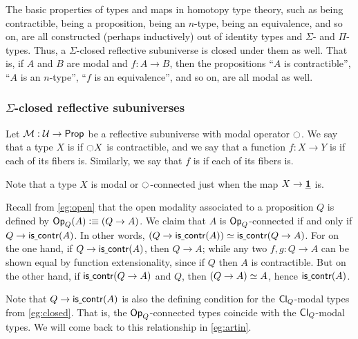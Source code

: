 \begin{rmk}
  The basic properties of types and maps in homotopy type theory, such as being contractible, being a proposition, being an $n$-type, being an equivalence, and so on, are all constructed (perhaps inductively) out of identity types and $\Sigma$- and $\Pi$-types.
  Thus, a $\Sigma$-closed reflective subuniverse is closed under them as well.
  That is, if $A$ and $B$ are modal and $f:A\to B$, then the propositions ``$A$ is contractible'', ``$A$ is an $n$-type'', ``$f$ is an equivalence'', and so on, are all modal as well.
\end{rmk}



\subsubsection{$\Sigma$-closed reflective subuniverses}
\label{sec:sigma-closed}

\begin{defn}\label{defn:connected}
Let $\mathcal{M}:\mathcal{U}\to\mathsf{Prop}$ be a reflective subuniverse with modal
operator ${\ocircle}$. We say
that a type $X$ is  if ${\ocircle} X$ is contractible,
and we say that a function $f:X\to Y$ is  if each
of its fibers is. Similarly, we say that $f$ is  if each of its
fibers is.
\end{defn}

Note that a type $X$ is modal or ${\ocircle}$-connected just when the map $X\to\underline{\mathbf{1}}$ is.

\begin{eg}\label{eg:closed-connected}
  Recall from \cref{eg:open} that the open modality associated to a proposition $Q$ is defined by $\mathsf{Op}_{Q}(A) \vcentcolon\equiv (Q\to A)$.
  We claim that $A$ is $\mathsf{Op}_{Q}$-connected if and only if $Q \to\mathsf{is\underline{\ }{}contr}(A)$.
  In other words, $(Q \to\mathsf{is\underline{\ }{}contr}(A))\simeq \mathsf{is\underline{\ }{}contr}(Q\to A)$.
  For on the one hand, if $Q\to \mathsf{is\underline{\ }{}contr}(A)$, then $Q\to A$; while any two $f,g:Q\to A$ can be shown equal by function extensionality, since if $Q$ then $A$ is contractible.
  But on the other hand, if $\mathsf{is\underline{\ }{}contr}(Q\to A)$ and $Q$, then $\eqv{(Q\to A)}{A}$, hence $\mathsf{is\underline{\ }{}contr}(A)$.

  Note that $Q \to\mathsf{is\underline{\ }{}contr}(A)$ is also the defining condition for the $\mathsf{Cl}_{Q}$-modal types from \cref{eg:closed}.
  That is, the $\mathsf{Op}_{Q}$-connected types coincide with the $\mathsf{Cl}_{Q}$-modal types.
  We will come back to this relationship in \cref{eg:artin}.
\end{eg}

